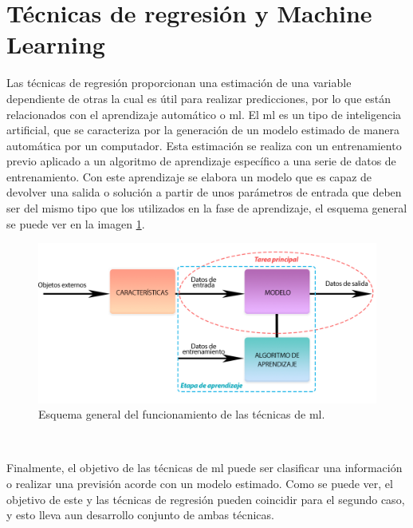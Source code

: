 \section{Técnicas de regresión y Machine Learning}
\par Las técnicas de regresión proporcionan una estimación de una variable dependiente de otras la cual es útil para realizar predicciones, por lo que están relacionados con el aprendizaje automático o \gls{ml}. El \gls{ml} es un tipo de inteligencia artificial, que se caracteriza por la generación de un modelo estimado de manera automática por un computador. Esta estimación se realiza con un entrenamiento previo aplicado a un algoritmo de aprendizaje específico a una serie de datos de entrenamiento. Con este aprendizaje se elabora un modelo que es capaz de devolver una salida o solución a partir de unos parámetros de entrada que deben ser del mismo tipo que los utilizados en la fase de aprendizaje, el esquema general se puede ver en la imagen \ref{fig:ml}. 
\\
\begin{figure}[h]
    \centering
    \includegraphics[width=.9\linewidth]{archivos/ESQUEMA_ML}
    \caption{Esquema general del funcionamiento de las técnicas de \gls{ml}.}
    \label{fig:ml}
\end{figure}
\\
\par Finalmente, el objetivo de las técnicas de \gls{ml} puede ser clasificar una información o realizar una previsión acorde con un modelo estimado. Como se puede ver, el objetivo de este y las técnicas de regresión pueden coincidir para el segundo caso, y esto lleva aun desarrollo conjunto de ambas técnicas. 

